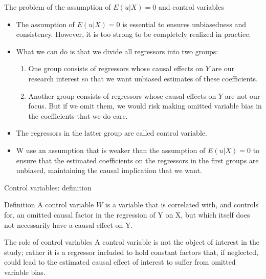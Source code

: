\documentclass[presentation,10pt]{beamer}
\begin{document}
\begin{frame}[label={sec:org923dcd8}]{The problem of the assumption of \(E(u|X) = 0\) and control variables}
\begin{itemize}
\item The assumption of \(E(u|X) = 0\) is essential to ensures unbiasedness
and consistency. However, it is too strong to be completely realized
in practice.

\item What we can do is that we divide all regressors into two groups:
\begin{enumerate}
\item One group consists of regressors whose causal effects on \(Y\) are our
research interest so that we want unbiased estimates of these
coefficients.
\item Another group consists of regressors whose causal effects on \(Y\) are
not our focus. But if we omit them, we would risk making omitted
variable bias in the coefficients that we do care.
\end{enumerate}

\item The regressors in the latter group are called \alert{control
variable}.

\item W use an assumption that is weaker than the assumption of
\(E(u|X)=0\) to ensure that the estimated coefficients on the
regressors in the first groups are unbiased, maintaining the causal
implication that we want.
\end{itemize}
\end{frame}

\begin{frame}[label={sec:orgdf993e5}]{Control variables: definition}
\begin{block}{Definition}
A control variable \(W\) is a variable that is correlated with, and
controls for, an omitted causal factor in the regression of Y on X,
but which itself does not necessarily have a causal effect on Y.
\end{block}

\begin{block}{The role of control variables}
A control variable is not the object of interest in the study; rather
it is a regressor included to hold constant factors that, if
neglected, could lead to the estimated causal effect of interest to
suffer from omitted variable bias.
\end{block}
\end{frame}
\end{document}
